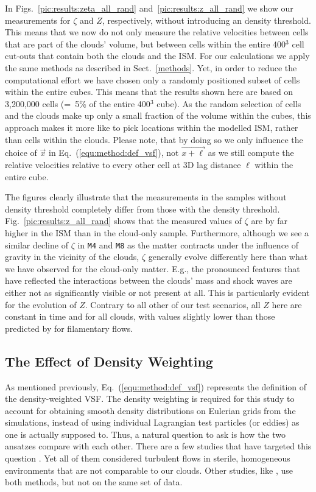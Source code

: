 In Figs.~\ref{pic:results:zeta_all_rand} and~\ref{pic:results:z_all_rand} we show our measurements for $\zeta$ and $Z$, respectively, without introducing an density threshold.
This means that we now do not only measure the relative velocities between cells that are part of the clouds' volume, but between cells within the entire 400$^3$ cell cut-outs that contain both the clouds and the ISM.
For our calculations we apply the same methods as described in Sect.~\ref{methods}. 
Yet, in order to reduce the computational effort we have chosen only a randomly positioned subset of cells within the entire cubes. 
This means that the results shown here are based on 3,200,000 cells (=~5\% of the entire 400$^3$ cube).
As the random selection of cells and the clouds make up only a small fraction of the volume within the cubes, this approach makes it more like to pick locations within the modelled ISM, rather than cells within the clouds. 
Please note, that by doing so we only influence the choice of $\vec{x}$ in Eq.~(\ref{equ:method:def_vsf}), not $\vec{x+\ell}$ as we still compute the relative velocities relative to every other cell at 3D lag distance $\ell$ within the entire cube. 


The figures clearly illustrate that the measurements in the samples without density threshold completely differ from those with the density threshold.
Fig.~\ref{pic:results:z_all_rand} shows that the measured values of $\zeta$ are by far higher in the ISM than in the cloud-only sample.
Furthermore, although we see a similar decline of $\zeta$ in \texttt{M4} and \texttt{M8} as the matter contracts under the influence of gravity in the vicinity of the clouds, $\zeta$ generally evolve differently here than what we have observed for the cloud-only matter.
E.g., the pronounced features that have reflected the interactions between the clouds' mass and shock waves are either not as significantly visible or not present at all.
This is particularly evident for the evolution of $Z$. 
Contrary to all other of our test scenarios, all $Z$ here are constant in time and for all clouds, with values slightly lower than those predicted by \citet{She1994} for filamentary flows.


\subsection{The Effect of Density Weighting}\label{results:densweight}

As mentioned previously, Eq.~(\ref{equ:method:def_vsf}) represents the definition of the density-weighted VSF.
The density weighting is required for this study to account for obtaining smooth density distributions on Eulerian grids from the simulations, instead of using individual Lagrangian test particles (or eddies) as one is actually supposed to.
Thus, a natural question to ask is how the two ansatzes compare with each other.
There are a few studies that have targeted this question . 
Yet all of them considered turbulent flows in sterile, homogeneous environments that are not comparable to our clouds.
Other studies, like \citet{Padoan2016a}, use both methods, but not on the same set of data. 

